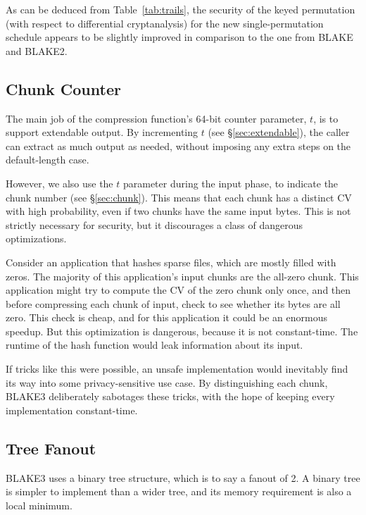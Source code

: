 \documentclass[11pt,notitlepage,a4paper]{article}
\begin{document}
As can be deduced from Table~\ref{tab:trails}, the security of the keyed permutation (with respect to differential cryptanalysis) for the new single-permutation schedule appears to be slightly improved in comparison to the one from BLAKE and BLAKE2. 

\subsection{Chunk Counter}\label{sec:chunkcounter}

The main job of the compression function's 64-bit counter parameter, $t$, is to
support extendable output. By incrementing $t$ (see \S\ref{sec:extendable}),
the caller can extract as much output as needed, without imposing any extra
steps on the default-length case.

However, we also use the $t$ parameter during the input phase, to indicate the
chunk number (see \S\ref{sec:chunk}). This means that each chunk has a distinct
CV with high probability, even if two chunks have the same input bytes. This is
not strictly necessary for security, but it discourages a class of dangerous
optimizations.

Consider an application that hashes sparse files, which are mostly filled with
zeros. The majority of this application's input chunks are the all-zero chunk.
This application might try to compute the CV of the zero chunk only once, and
then before compressing each chunk of input, check to see whether its bytes are
all zero. This check is cheap, and for this application it could be an enormous
speedup. But this optimization is dangerous, because it is not constant-time.
The runtime of the hash function would leak information about its input.

If tricks like this were possible, an unsafe implementation would inevitably
find its way into some privacy-sensitive use case. By distinguishing each
chunk, BLAKE3 deliberately sabotages these tricks, with the hope of keeping
every implementation constant-time.

\subsection{Tree Fanout}\label{sec:treefanout}

BLAKE3 uses a binary tree structure, which is to say a fanout of 2. A binary
tree is simpler to implement than a wider tree, and its memory requirement is
also a local minimum.
\end{document}
